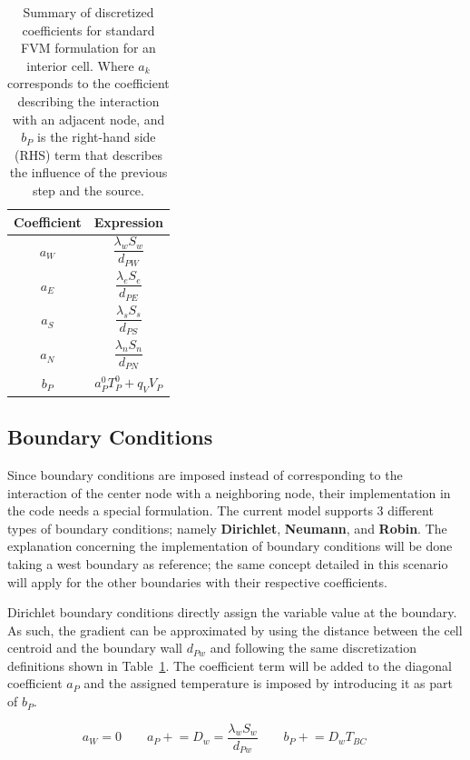 \begin{table}
    \centering
    \begin{tabular}{|c|c|}
        \hline
        Coefficient & Expression \\
        \hline
        $a_W$ & $\dfrac{\lambda_w S_w}{d_{PW}}$ \\
        $a_E$ & $\dfrac{\lambda_e S_e}{d_{PE}}$ \\
        $a_S$ & $\dfrac{\lambda_s S_s}{d_{PS}}$ \\
        $a_N$ & $\dfrac{\lambda_n S_n}{d_{PN}}$ \\
        $b_P$ & $a^0_P T^0_P + q_V V_P$ \\
        \hline
    \end{tabular}
    \caption{Summary of discretized coefficients for standard FVM formulation for an interior cell. Where $a_k$ corresponds to the coefficient describing the interaction with an adjacent node, and $b_P$ is the right-hand side (RHS) term that describes the influence of the previous step and the source.}
    \label{tabDiffCoeff}
\end{table}

\subsection{Boundary Conditions}
Since boundary conditions are imposed instead of corresponding to the interaction of the center node with a neighboring node, their implementation in the code needs a special formulation. The current model supports 3 different types of boundary conditions; namely \textbf{Dirichlet}, \textbf{Neumann}, and \textbf{Robin}. The explanation concerning the implementation of boundary conditions will be done taking a west boundary as reference; the same concept detailed in this scenario will apply for the other boundaries with their respective coefficients. 

Dirichlet boundary conditions directly assign the variable value at the boundary. As such, the gradient can be approximated by using the distance between the cell centroid and the boundary wall $d_{Pw}$ and following the same discretization definitions shown in Table~\ref{tabDiffCoeff}. The coefficient term will be added to the diagonal coefficient $a_P$ and the assigned temperature is imposed by introducing it as part of $b_P$. 

\begin{equation}~\label{eqDiffBCDir}
    a_W = 0 \qquad
    a_P \mathrel{+}= D_w = \dfrac{\lambda_w S_w}{d_{Pw}} \qquad
    b_P \mathrel{+}= D_w T_{BC} \qquad
\end{equation}

